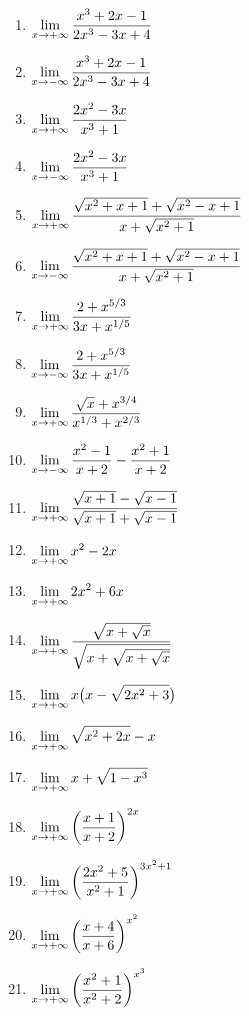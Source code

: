 \begin{multicols}{2}
    \begin{enumerate}
    \item $\displaystyle \lim_{x\to+\infty} \frac{x^3+2x-1}{2x^3-3x+4}$
    \item $\displaystyle \lim_{x\to-\infty} \frac{x^3+2x-1}{2x^3-3x+4}$
    \item $\displaystyle \lim_{x\to+\infty} \frac{2x^2-3x}{x^3+1}$
    \item $\displaystyle \lim_{x\to-\infty} \frac{2x^2-3x}{x^3+1}$
    \item $\displaystyle \lim_{x\to+\infty} \frac{\sqrt{x^2+x+1}+\sqrt{x^2-x+1}}{x+\sqrt{x^2+1}}$
    \item $\displaystyle \lim_{x\to-\infty} \frac{\sqrt{x^2+x+1}+\sqrt{x^2-x+1}}{x+\sqrt{x^2+1}}$
    \item $\displaystyle \lim_{x\to+\infty} \frac{2+x^{5/3}}{3x+x^{1/5}}$
    \item $\displaystyle \lim_{x\to-\infty} \frac{2+x^{5/3}}{3x+x^{1/5}}$
    \item $\displaystyle \lim_{x\to+\infty} \frac{\sqrt{x}+x^{3/4}}{x^{1/3}+x^{2/3}}$
    \item $\displaystyle \lim_{x\to-\infty} \frac{x^2-1}{x+2}-\frac{x^2+1}{x+2}$
    \item $\displaystyle \lim_{x\to+\infty} \frac{\sqrt{x+1}-\sqrt{x-1}}{\sqrt{x+1}+\sqrt{x-1}}$
    \item $\displaystyle \lim_{x\to+\infty} x^2-2x$
    \item $\displaystyle \lim_{x\to+\infty} 2x^2+6x$
    \item $\displaystyle \lim_{x\to+\infty} \frac{\sqrt{x+\sqrt{x}}}{\sqrt{x+\sqrt{x+\sqrt{x}}}}$
    \item $\displaystyle \lim_{x\to+\infty} x\big(x-\sqrt{2x^2+3}\big)$
    \item $\displaystyle \lim_{x\to+\infty} \sqrt{x^2+2x}-x$
    \item $\displaystyle \lim_{x\to+\infty} x+\sqrt{1-x^3}$
    \item $\displaystyle \lim_{x\to+\infty} \bigg(\frac{x+1}{x+2}\bigg)^{2x}$
    \item $\displaystyle \lim_{x\to+\infty} \bigg(\frac{2x^2+5}{x^2+1}\bigg)^{3x^2+1}$
    \item $\displaystyle \lim_{x\to+\infty} \bigg(\frac{x+4}{x+6}\bigg)^{x^2}$
    \item $\displaystyle \lim_{x\to+\infty} \bigg(\frac{x^2+1}{x^2+2}\bigg)^{x^3}$
    
    
    \end{enumerate}
\end{multicols}

